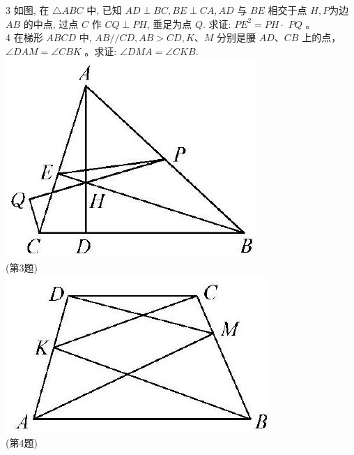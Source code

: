 \documentclass[10pt]{article}
\begin{document}
3 如图, 在 $\triangle A B C$ 中, 已知 $A D \perp B C, B E \perp C A, A D$ 与 $B E$ 相交于点 $H, P$为边 $A B$ 的中点, 过点 $C$ 作 $C Q \perp P H$, 垂足为点 $Q$. 求证: $P E^{2}=P H \cdot$ $P Q$ 。\\
4 在梯形 $A B C D$ 中, $A B / / C D, A B>C D, K 、 M$ 分别是腰 $A D 、 C B$ 上的点， $\angle D A M=\angle C B K$ 。求证: $\angle D M A=\angle C K B$.\\
\includegraphics[max width=\textwidth, center]{2024_10_30_66b8e5e701da2093c133g-050(4)}\\
(第3题)\\
\includegraphics[max width=\textwidth, center]{2024_10_30_66b8e5e701da2093c133g-050(5)}\\
(第4题)\\
\end{document}
